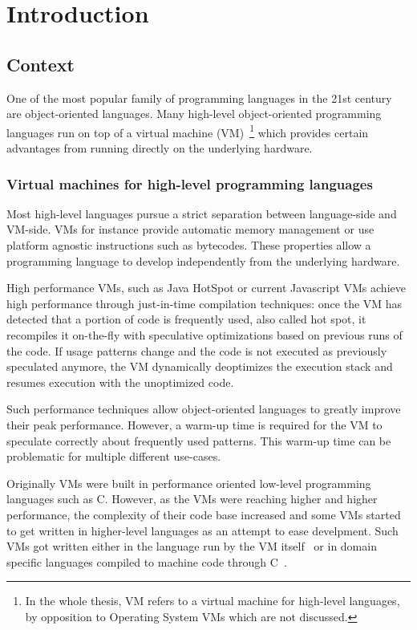 \documentclass[a4paper,12pt,twoside]{../includes/ThesisStyle}
\begin{document}
\fi

\chapter{Introduction}
\label{chap:intro}
\minitoc

\section{Context}

One of the most popular family of programming languages in the 21st century are object-oriented languages. Many high-level object-oriented programming languages run on top of a virtual machine (VM)~\footnote{In the whole thesis, VM refers to a virtual machine for high-level languages, by opposition to Operating System VMs which are not discussed.} which provides certain advantages from running directly on the underlying hardware. 

\subsection{Virtual machines for high-level programming languages}

Most high-level languages pursue a strict separation between language-side and VM-side. VMs for instance provide automatic memory management or use platform agnostic instructions such as bytecodes. These properties allow a programming language to develop independently from the underlying hardware.

High performance VMs, such as Java HotSpot or current Javascript VMs achieve high performance through just-in-time compilation techniques: once the VM has detected that a portion of code is frequently used, also called hot spot, it recompiles it on-the-fly with speculative optimizations based on previous runs of the code. If usage patterns change and the code is not executed as previously speculated anymore, the VM dynamically deoptimizes the execution stack and resumes execution with the unoptimized code.

Such performance techniques allow object-oriented languages to greatly improve their peak performance. However, a warm-up time is required for the VM to speculate correctly about frequently used patterns. This warm-up time can be problematic for multiple different use-cases.

Originally VMs were built in performance oriented low-level programming languages such as C. However, as the VMs were reaching higher and higher performance, the complexity of their code base increased and some VMs started to get written in higher-level languages as an attempt to ease develpment. Such VMs got written either in the language run by the VM itself~\cite{Unga05b,Wimm13a,Alp99a} or in domain specific languages compiled to machine code through C~\cite{Rigo06a,Inga97a}.
\end{document}
